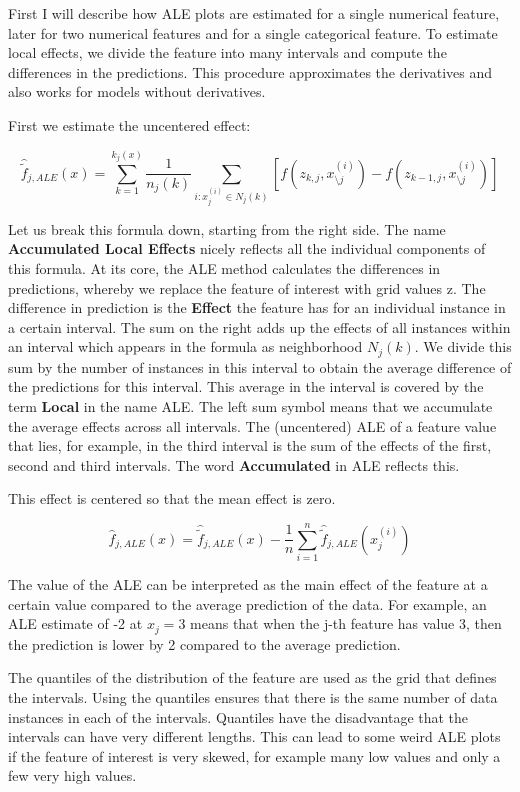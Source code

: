 \documentclass[
  12pt,
]{krantz}
\begin{document}
First I will describe how ALE plots are estimated for a single numerical feature, later for two numerical features and for a single categorical feature.
To estimate local effects, we divide the feature into many intervals and compute the differences in the predictions.
This procedure approximates the derivatives and also works for models without derivatives.

First we estimate the uncentered effect:

\[\hat{\tilde{f}}_{j,ALE}(x)=\sum_{k=1}^{k_j(x)}\frac{1}{n_j(k)}\sum_{i:x_{j}^{(i)}\in{}N_j(k)}\left[f(z_{k,j},x^{(i)}_{\setminus{}j})-f(z_{k-1,j},x^{(i)}_{\setminus{}j})\right]\]

Let us break this formula down, starting from the right side.
The name \textbf{Accumulated Local Effects} nicely reflects all the individual components of this formula.
At its core, the ALE method calculates the differences in predictions, whereby we replace the feature of interest with grid values z.
The difference in prediction is the \textbf{Effect} the feature has for an individual instance in a certain interval.
The sum on the right adds up the effects of all instances within an interval which appears in the formula as neighborhood \(N_j(k)\).
We divide this sum by the number of instances in this interval to obtain the average difference of the predictions for this interval.
This average in the interval is covered by the term \textbf{Local} in the name ALE.
The left sum symbol means that we accumulate the average effects across all intervals.
The (uncentered) ALE of a feature value that lies, for example, in the third interval is the sum of the effects of the first, second and third intervals.
The word \textbf{Accumulated} in ALE reflects this.

This effect is centered so that the mean effect is zero.

\[\hat{f}_{j,ALE}(x)=\hat{\tilde{f}}_{j,ALE}(x)-\frac{1}{n}\sum_{i=1}^{n}\hat{\tilde{f}}_{j,ALE}(x^{(i)}_{j})\]

The value of the ALE can be interpreted as the main effect of the feature at a certain value compared to the average prediction of the data.
For example, an ALE estimate of -2 at \(x_j=3\) means that when the j-th feature has value 3, then the prediction is lower by 2 compared to the average prediction.

The quantiles of the distribution of the feature are used as the grid that defines the intervals.
Using the quantiles ensures that there is the same number of data instances in each of the intervals.
Quantiles have the disadvantage that the intervals can have very different lengths.
This can lead to some weird ALE plots if the feature of interest is very skewed, for example many low values and only a few very high values.
\end{document}

